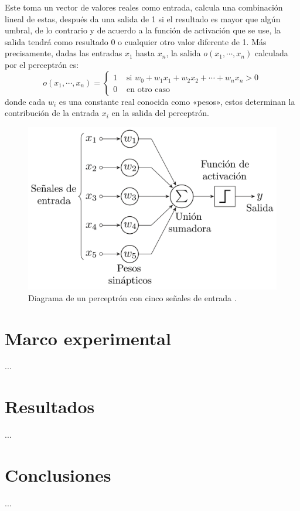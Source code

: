 \documentclass[12pt,letterpaper,oneside,openright]{book}
\begin{document}
	Este toma un vector de valores reales como entrada, calcula una combinación lineal de estas, después da una salida de 1 si el resultado es mayor que algún umbral, de lo contrario y de acuerdo a la función de activación que se use, la salida tendrá como resultado 0 o cualquier otro valor diferente de 1. Más precisamente, dadas las entradas $x_1$ hasta $x_n$, la salida $o(x_1,\dotsb,x_n)$ calculada por el perceptrón es: 
	\begin{equation}
		\label{eq:percept}
		o(x_1,\dotsb,x_n) = \left\{\begin{array}{lll}
			1 & \text { si } w_0 + w_1x_1 + w_2x_2 + \dotsb + w_nx_n > 0 \\
			0 & \text { en otro caso } 
		\end{array}\right.
	\end{equation}
	donde cada $w_i$ es una constante real conocida como «pesos», estos determinan la contribución de la entrada $x_i$ en la salida del perceptrón.
	\begin{figure}[h]
		\centering
		\includegraphics[width=0.8\linewidth]{Sem_1/figuras/Perceptron}
		\caption{Diagrama de un perceptrón con cinco señales de entrada \cite{imaPercep}.}
		\label{fig:diagrama_perceptron}
	\end{figure}
	

\chapter{Marco experimental}

...

\chapter{Resultados}

...

\chapter{Conclusiones}

...


 
\end{document}

